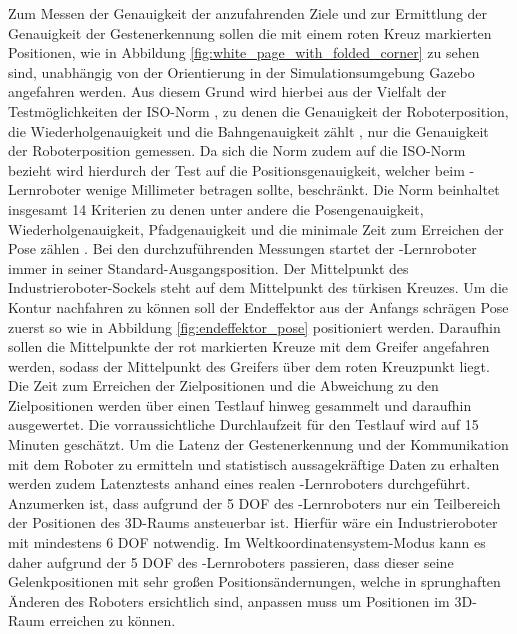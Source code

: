 Zum Messen der Genauigkeit der anzufahrenden Ziele und zur Ermittlung der Genauigkeit der Gestenerkennung sollen die mit einem roten Kreuz markierten Positionen, wie in Abbildung \ref{fig:white_page_with_folded_corner} zu sehen sind, unabhängig von der Orientierung in der Simulationsumgebung Gazebo angefahren werden. Aus diesem Grund wird hierbei aus der Vielfalt der Testmöglichkeiten der ISO-Norm , zu denen die Genauigkeit der Roboterposition, die Wiederholgenauigkeit und die Bahngenauigkeit zählt \cite{1400-1700_iso_nodate}, nur die Genauigkeit der Roboterposition gemessen. Da sich die Norm  zudem auf die ISO-Norm  bezieht wird hierdurch der Test auf die Positionsgenauigkeit, welcher beim -Lernroboter wenige Millimeter betragen sollte, beschränkt. Die Norm  beinhaltet insgesamt 14 Kriterien zu denen unter andere die Posengenauigkeit, Wiederholgenauigkeit, Pfadgenauigkeit und die minimale Zeit zum Erreichen der Pose zählen \cite{1400-1700_isotr_nodate}. Bei den durchzuführenden Messungen startet der -Lernroboter immer in seiner Standard-Ausgangsposition. Der Mittelpunkt des Industrieroboter-Sockels steht auf dem Mittelpunkt des türkisen Kreuzes. Um die Kontur nachfahren zu können soll der Endeffektor aus der Anfangs schrägen Pose zuerst so wie in Abbildung \ref{fig:endeffektor_pose} positioniert werden. Daraufhin sollen die Mittelpunkte der rot markierten Kreuze mit dem Greifer angefahren werden, sodass der Mittelpunkt des Greifers über dem roten Kreuzpunkt liegt. Die Zeit zum Erreichen der Zielpositionen und die Abweichung zu den Zielpositionen werden über einen Testlauf hinweg gesammelt und daraufhin ausgewertet. Die vorraussichtliche Durchlaufzeit für den Testlauf wird auf 15 Minuten geschätzt. Um die Latenz der Gestenerkennung und der Kommunikation mit dem Roboter zu ermitteln und statistisch aussagekräftige Daten zu erhalten werden zudem Latenztests anhand eines realen -Lernroboters durchgeführt. Anzumerken ist, dass aufgrund der 5 DOF des -Lernroboters nur ein Teilbereich der Positionen des 3D-Raums ansteuerbar ist. Hierfür wäre ein Industrieroboter mit mindestens 6 DOF notwendig. Im Weltkoordinatensystem-Modus kann es daher aufgrund der 5 DOF des -Lernroboters passieren, dass dieser seine Gelenkpositionen mit sehr großen Positionsändernungen, welche in sprunghaften Änderen des Roboters ersichtlich sind, anpassen muss um Positionen im 3D-Raum erreichen zu können.

